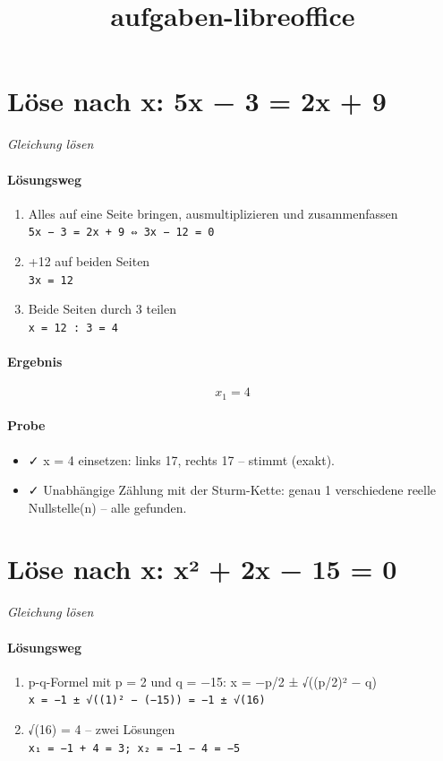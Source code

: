 \documentclass[11pt,a4paper]{article}
\title{aufgaben-libreoffice}
\date{}
\begin{document}
\maketitle
\section*{Löse nach x: 5x − 3 = 2x + 9}
\textit{Gleichung lösen}

\paragraph{Lösungsweg}
\begin{enumerate}
  \item Alles auf eine Seite bringen, ausmultiplizieren und zusammenfassen\\
  \texttt{5x − 3 = 2x + 9  ⇔  3x − 12 = 0}
  \item +12 auf beiden Seiten\\
  \texttt{3x = 12}
  \item Beide Seiten durch 3 teilen\\
  \texttt{x = 12 : 3 = 4}
\end{enumerate}
\paragraph{Ergebnis}
\[ x_{1} = 4 \]
\paragraph{Probe}
\begin{itemize}
  \item ✓ x = 4 einsetzen: links 17, rechts 17 – stimmt (exakt).
  \item ✓ Unabhängige Zählung mit der Sturm-Kette: genau 1 verschiedene reelle Nullstelle(n) – alle gefunden.
\end{itemize}
\section*{Löse nach x: x² + 2x − 15 = 0}
\textit{Gleichung lösen}

\paragraph{Lösungsweg}
\begin{enumerate}
  \item p-q-Formel mit p = 2 und q = −15: x = −p/2 ± √((p/2)² − q)\\
  \texttt{x = −1 ± √((1)² − (−15)) = −1 ± √(16)}
  \item √(16) = 4 – zwei Lösungen\\
  \texttt{x₁ = −1 + 4 = 3;  x₂ = −1 − 4 = −5}
\end{enumerate}
\end{document}
